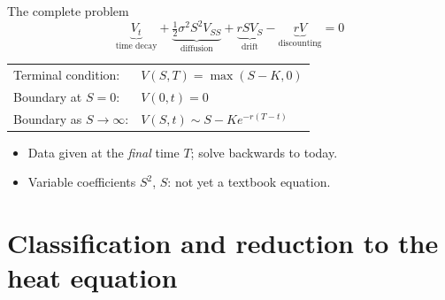 \documentclass[11pt]{beamer}
\begin{document}
\begin{frame}{The complete problem}
  \[
    \underbrace{V_t}_{\text{time decay}}
    +\underbrace{\tfrac12\sigma^2S^2V_{SS}}_{\text{diffusion}}
    +\underbrace{rSV_S}_{\text{drift}}
    -\underbrace{rV}_{\text{discounting}}=0
  \]
  \vspace{4pt}
  \begin{center}
  \begin{tabular}{ll}
    Terminal condition: & $V(S,T)=\max(S-K,0)$\\[4pt]
    Boundary at $S=0$: & $V(0,t)=0$\\[4pt]
    Boundary as $S\to\infty$: & $V(S,t)\sim S-Ke^{-r(T-t)}$
  \end{tabular}
  \end{center}
  \vspace{6pt}
  \begin{itemize}
    \item Data given at the \emph{final} time $T$; solve backwards to today.
    \item Variable coefficients $S^2$, $S$: not yet a textbook equation.
  \end{itemize}
\end{frame}

\section{Classification and reduction to the heat equation}
\end{document}
